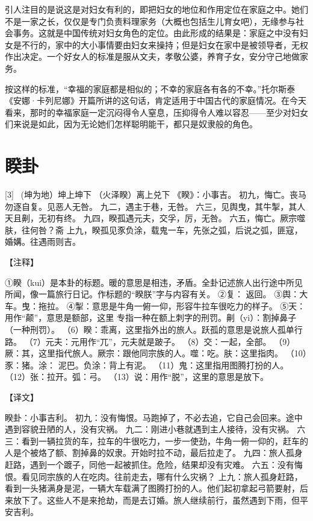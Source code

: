 \documentclass[12pt,UTF8]{ctexbook}
\begin{document}
引人注目的是说这是对妇女有利的，即把妇女的地位和作用定位在家庭之中。她们不是一家之长，仅仅是专门负责料理家务（大概也包括生儿育女吧），无缘参与社会事务。这就是中国传统对妇女角色的定位。由此形成的结果是：家庭之中没有妇女是不行的，家中的大小事情要由妇女来操持；但是妇女在家中是被领导者，无权作出决定。一个好女人的标准是服从文夫，孝敬公婆，养育子女，安分守己地做家务。

按这样的标准，“幸福的家庭都是相似的；不幸的家庭各有各的不幸。”托尔斯泰《安娜·卡列尼娜》开篇所讲的这句话，肯定适用于中国古代的家庭情况。在今天看来，那时的幸福家庭一定沉闷得令人窒息，压抑得令人难以容忍——至少对妇女们来说是如此，因为无论她们怎样聪明能干，都只是奴隶般的角色。

\chapter{睽卦}
[3] \ (坤为地）坤上坤下
（火泽睽）离上兑下
《睽》：小事吉。
初九，悔亡。丧马勿逐自复。见恶人无咎。
九二，遇主于巷，无咎。
六三，见舆曳，其牛掣，其人天且劓，无初有终。
九四，睽孤遇元夫，交孚，厉，无咎。
六五，悔亡。厥宗噬肤，往何咎？斋
上九，睽孤见豕负涂，载鬼一车，先张之弧，后说之弧，匪寇，婚媾。往遇雨则吉。

【注释】

①睽（kui）是本卦的标题。暖的意思是相违，矛盾。全卦记述旅人出行途中所见所闻，像一篇旅行日记。作标题的“睽朕”字与内容有关。
②复： 返回。
③舆：大车。曳：拖拉。
④掣：意思是牛角一俯一仰，形容牛拉车很吃力的样子。
⑤天：用作“颠”，意思是额部，这里 专指一种在额上刺字的刑罚。劓（yi）：割掉鼻子（一种刑罚）。
（6）睽：乖离，这里指外出的旅人。跃孤的意思是说旅人孤单行路。
（7）元夫：元用作“兀”，元夫就是跛子。
（8）交：一起，全部。
（9）厥：其，这里指代旅人。厥宗：跟他同宗族的人。噬：吃。肤：这里指肉。
（10）豕：猪。涂： 泥巴。负涂：背上有泥。
（11）鬼：这里指用图腾打扮的人。
（12）张：拉开。弧：弓。
（13）说：用作“脱”，这里的意思是放下。

【译文】

睽卦：小事吉利。
初九：没有悔恨。马跑掉了，不必去追，它自己会回来。途中遇到容貌丑陋的人，没有灾祸。
九二：刚进小巷就遇到主人接待，没有灾祸。
六三：看到一辆拉货的车，拉车的牛很吃力，一步一使劲，牛角一俯一仰的，赶车的人是个被烙了额、割掉鼻的奴隶。开始时拉不动，最后拉走了。
九四：旅人孤身赶路，遇到一个踱子，同他一起被抓住。危险，结果却没有灾难。
六五：没有悔恨。看见同宗族的人在吃肉。往前走去，哪有什么灾祸？
上九：旅人孤身赶路，看到一头猪满身是泥，一辆大车载满了图腾打扮的人。他们起初拿起弓箭要射，后来放下了。这些人不是来抢劫，而是去订婚。旅人继续前行，虽然遇到下雨，但平安吉利。
\end{document}
